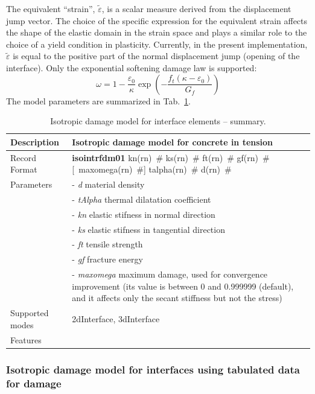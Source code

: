 \documentclass[a4paper]{article}
\newcommand{\descitem}[1]{{\noindent \bf #1}}
\newcommand{\elemparam}[2]{{{#1\tiny (#2)}~\#}}
\newcommand{\optelemparam}[2]{[{~\elemparam{#1}{#2}}]}
\newcommand{\param}[1]{{\it #1}}
\begin{document}
The equivalent ``strain'', $\tilde\varepsilon$, is a scalar measure derived from the displacement jump vector. The choice of the specific expression
for the equivalent strain affects the shape of the elastic domain
in the strain space and plays a similar role to the choice of a yield
condition in plasticity.
Currently, in the present implementation,  $\tilde\varepsilon$ is equal to the positive part of the normal displacement jump (opening of the interface).
Only the exponential softening damage law is supported:
$$
\omega = 1 - \frac{\varepsilon_0}{\kappa}  \exp\left( - \frac{f_t( \kappa - \varepsilon_0 )}{G_f} \right)
$$
The model parameters are summarized in Tab.~\ref{iid_table}. 
\begin{table}[!htb]
  \small
\begin{tabular}{|l|p{9cm}|}
\hline
Description & Isotropic damage model for concrete in tension\\
\hline
Record Format & \descitem{isointrfdm01} 
\elemparam{kn}{rn} \elemparam{ks}{rn} \elemparam{ft}{rn} \elemparam{gf}{rn} \optelemparam{maxomega}{rn} \elemparam{talpha}{rn} \elemparam{d}{rn}\\
Parameters & - \param{d} material density\\
&- \param{tAlpha} thermal dilatation coefficient\\
&- \param{kn} elastic stifness in normal direction\\
&- \param{ks} elastic stifness in tangential direction\\
&- \param{ft} tensile strength\\
&- \param{gf} fracture energy\\
&- \param{maxomega} maximum damage, used for convergence improvement
(its value is between 0 and 0.999999 (default), 
and it affects only the secant stiffness but not the stress)\\
Supported modes& 2dInterface, 3dInterface\\
Features & \\
\hline
\end{tabular}
\caption{Isotropic damage model for interface elements -- summary.}
\label{iid_table}
\end{table}

\subsubsection{Isotropic damage model for interfaces using tabulated data for damage}
\label{sec:idmfi}
\end{document}
